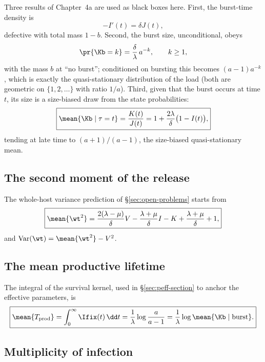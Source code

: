Three results of Chapter~4a are used as black boxes here. First, the
burst-time density is
\begin{equation}
-I'(t)=\delta J(t),
\label{eq:phi}
\end{equation}
defective with total mass $1-b$. Second, the burst size, unconditional,
obeys
\begin{equation}
\pr{\Kb=k}=\frac{\delta}{\lambda}\,a^{-k},\qquad k\ge1,
\label{eq:burstlaw}
\end{equation}
with the mass $b$ at ``no burst''; conditioned on bursting this becomes
$(a-1)a^{-k}$, which is exactly the quasi-stationary distribution of the
load (both are geometric on $\{1,2,\ldots\}$ with ratio $1/a$). Third,
given that the burst occurs at time $t$, its size is a size-biased draw
from the state probabilities:
\begin{equation}
\boxed{\mean{\Kb\mid\tau=t}=\frac{K(t)}{J(t)}
=1+\frac{2\lambda}{\delta}\bigl(1-I(t)\bigr),}
\label{eq:sizebias}
\end{equation}
tending at late time to $(a+1)/(a-1)$, the size-biased quasi-stationary
mean.

\subsection{The second moment of the release}

The whole-host variance prediction of \S\ref{sec:open-problems} starts from
\begin{equation}
\boxed{\mean{\wt^2}
=\frac{2(\lambda-\mu)}{\delta}V
-\frac{\lambda+\mu}{\delta}I
-K
+\frac{\lambda+\mu}{\delta}
+1,}
\label{eq:EW2}
\end{equation}
and $\mathrm{Var}(\wt)=\mean{\wt^2}-V^2$.

\subsection{The mean productive lifetime}

The integral of the survival kernel, used in \S\ref{sec:peff-section} to
anchor the effective parameters, is
\begin{equation}
\boxed{\mean{T_{\rm prod}}=\int_0^\infty\Ifix(t)\,\dd t
=\frac{1}{\lambda}\log\frac{a}{a-1}
=\frac{1}{\lambda}\log\mean{\Kb\mid\text{burst}}.}
\label{prop:lifetime}
\end{equation}

\subsection{Multiplicity of infection}

